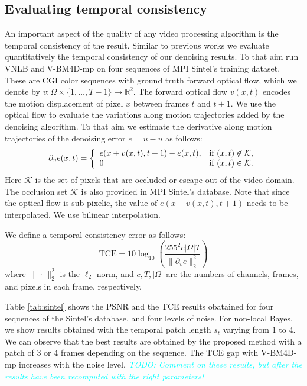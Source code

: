\documentclass[10pt, journal, twocolumn, final, a4paper]{IEEEtran}
\newcommand{\pa}[1]{\textcolor{cyan}{#1}}
\newcommand{\pcomment}[1]{\textit{\pa{#1}}}
\begin{document}
\subsection{Evaluating temporal consistency}
\label{sse:temporal-consistency}

An important aspect of the quality of any video processing algorithm is the 
temporal consistency of the result. Similar to previous works \cite{Liu2010, Sutour2014}
we evaluate quantitatively the temporal consistency of our denoising results.
To that aim run VNLB and V-BM4D-mp on four sequences of MPI Sintel's training
dataset. These are CGI color sequences with ground truth forward optical flow, which we
denote by $v:\Omega\times\{1,\dots,T-1\}\rightarrow \mathds R^2$. 
The forward optical flow $v(x,t)$ encodes the motion displacement of pixel $x$
between frames $t$ and $t +1$.
We use the optical flow to evaluate the variations along motion trajectories
added by the denoising algorithm. To that aim we estimate the derivative along
motion trajectories of the denoising error $e = \widetilde u - u$ as follows:
\[\partial_v e(x,t) =
\left\{
\begin{array}{l l}
	e(x + v(x,t), t+1) - e(x,t), & \text{if } (x,t)\not\in \mathcal{K},\\
	0 & \text{if } (x,t)\in \mathcal{K}.
\end{array}
\right.\]
Here $\mathcal K$ is the set of pixels that are occluded or escape out of the video
domain. The occlusion set $\mathcal K$ is also provided in MPI Sintel's database.
Note that since the optical flow is sub-pixelic, the value of $e(x + v(x,t),t+1)$
needs to be interpolated. We use bilinear interpolation.

We define a temporal consistency error as follows:
\[\text{TCE} = 10 \log_{10}\left(\frac{255^2 c|\Omega|T}{\|\partial_v e\|_2^2}\right)\]
where $\|\,\cdot\,\|_2^2$ is the $\ell_2$ norm, and $c, T, |\Omega|$ are the numbers
of channels, frames, and pixels in each frame, respectively.

Table \ref{tab:sintel} shows the PSNR and the TCE results obatained for four sequences of the
Sintel's database, and four levels of noise. For non-local Bayes, we show results obtained with 
the temporal patch length $s_t$ varying from $1$ to $4$. We can observe that the best results
are obtained by the proposed method with a patch of $3$ or $4$ frames depending
on the sequence. The TCE gap with V-BM4D-mp increases with the noise level. 
\pcomment{TODO: Comment on these results, but after the results have been
recomputed with the right parameters!}
\end{document}
